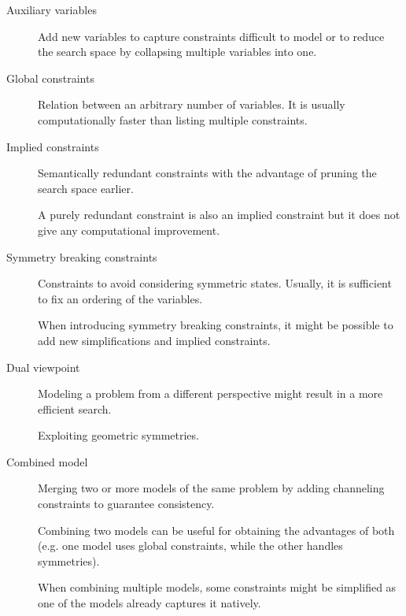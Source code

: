 \begin{description}
    \item[Auxiliary variables] 
        Add new variables to capture constraints difficult to model or 
        to reduce the search space by collapsing multiple variables into one. 


    \item[Global constraints] 
        Relation between an arbitrary number of variables.
        It is usually computationally faster than listing multiple constraints.


    \item[Implied constraints] 
        Semantically redundant constraints with the advantage of pruning the search space earlier.

        \begin{remark}
            A purely redundant constraint is also an implied constraint but it does not give any computational improvement.
        \end{remark}

        
    \item[Symmetry breaking constraints] 
        Constraints to avoid considering symmetric states. 
        Usually, it is sufficient to fix an ordering of the variables.

        \begin{remark}
            When introducing symmetry breaking constraints, 
            it might be possible to add new simplifications and implied constraints.
        \end{remark}

    
    \item[Dual viewpoint] 
        Modeling a problem from a different perspective might result in a more efficient search.
        \begin{example}
            Exploiting geometric symmetries.
        \end{example}


    \item[Combined model] 
        Merging two or more models of the same problem by adding channeling constraints to guarantee consistency.

        Combining two models can be useful for obtaining the advantages of both 
        (e.g. one model uses global constraints, while the other handles symmetries).

        \begin{remark}
            When combining multiple models, some constraints might be simplified as one of the models already captures it natively.
        \end{remark}
\end{description}



